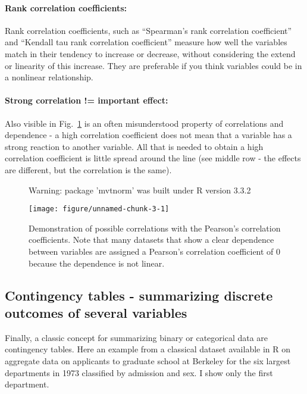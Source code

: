 \documentclass[a4paper,twoside]{tufte-book}\usepackage[]{graphicx}\usepackage[]{color}
\makeatletter
\def\maxwidth{ %
  \ifdim\Gin@nat@width>\linewidth
    \linewidth
  \else
    \Gin@nat@width
  \fi
}
\makeatother
\begin{document}
\paragraph{Rank correlation coefficients:} Rank correlation coefficients, such as ``Spearman's rank correlation coefficient'' and ``Kendall tau rank correlation coefficient'' measure how well the variables match in their tendency to increase or decrease, without considering the extend or linearity of this increase. They are preferable if you think variables could be in a nonlinear relationship.

\paragraph{Strong correlation != important effect:} Also visible in Fig.~\ref{fig: correlation} is an often misunderstood property of correlations and dependence - a high correlation coefficient does not mean that a variable has a strong reaction to another variable. All that is needed to obtain a high correlation coefficient is little spread around the line (see middle row - the effects are different, but the correlation is the same). 


\begin{figure}[htbp]
\begin{center}
\begin{Schunk}
\begin{Soutput}
Warning: package 'mvtnorm' was built under R version 3.3.2
\end{Soutput}

\texttt{[image: figure/unnamed-chunk-3-1]} \end{Schunk}
\caption{Demonstration of possible correlations with the Pearson's correlation coefficients. Note that many datasets that show a clear dependence between variables are assigned a Pearson's correlation coefficient of 0 because the dependence is not linear.}
\label{fig: correlation}
\end{center}
\end{figure}

\subsection{Contingency tables - summarizing discrete outcomes of several variables}

Finally, a classic concept for summarizing binary or categorical data are contingency tables. Here an example from a classical dataset available in R on aggregate data on applicants to graduate school at Berkeley for the six largest departments in 1973 classified by admission and sex. I show only the first department.
\end{document}
